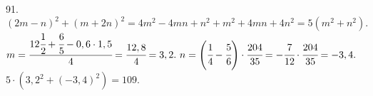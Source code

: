 91. $(2m-n)^2+(m+2n)^2=4m^2-4mn+n^2+m^2+4mn+4n^2=5(m^2+n^2).$\\
$m=\cfrac{12\cfrac{1}{2}+\cfrac{6}{5}-0,6\cdot1,5}{4}=\cfrac{12,8}{4}=3,2.\ n=\left(\cfrac{1}{4}-\cfrac{5}{6}\right)\cdot\cfrac{204}{35}=-\cfrac{7}{12}\cdot
\cfrac{204}{35}=-3,4.$\\
$5\cdot(3,2^2+(-3,4)^2)=109.$\\
